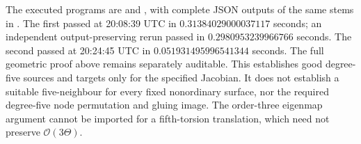 \begin{remark}
\label{rem:five-theta-self-isogeny-scope-candidate}
The executed programs are
 and
, with complete
JSON outputs of the same stems in . The first passed
at 20:08:39 UTC in $0.31384029000037117$ seconds; an independent
output-preserving rerun passed in $0.2980953239966766$ seconds.
The second passed at 20:24:45 UTC in $0.051931495996541344$ seconds.
The full geometric proof above remains separately auditable.
This establishes good degree-five sources and targets only for the
specified Jacobian. It does not establish a suitable five-neighbour
for every fixed nonordinary surface, nor the required degree-five
node permutation and gluing image. The order-three eigenmap
argument cannot be imported for a fifth-torsion translation,
which need not preserve $\mathcal O(3\Theta)$.
\end{remark}
